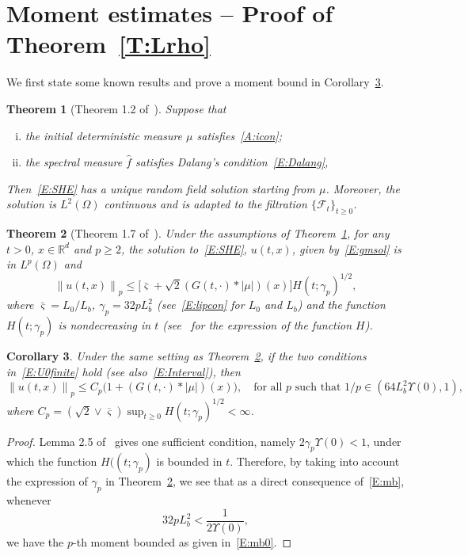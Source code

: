 \documentclass[a4paper,11pt]{article}%
\theoremstyle{plain}
\newtheorem{theorem}{Theorem}[section]
\newtheorem{corollary}[theorem]{Corollary}
\theoremstyle{definition}
\numberwithin{equation}{section}
\newcommand{\R}{\mathbb{R}}
\newcommand{\Norm}[1]{\left\| #1 \right\|}
\begin{document}
\section{Moment estimates -- Proof of Theorem~\ref{T:Lrho}}\label{S:Lrho}
We first state some known results and prove a moment bound in Corollary~\ref{C:Mom}.

\begin{theorem}[Theorem 1.2 of~\cite{chen.huang:19:comparison}]\label{T:Solve}
  Suppose that
  \begin{enumerate}[(i)]
   \item the initial deterministic measure $\mu$ satisfies~\eqref{A:icon};
   \item the spectral measure $\widehat{f}$ satisfies \textit{Dalang's condition}~\eqref{E:Dalang},
  \end{enumerate}
  Then~\eqref{E:SHE} has a unique random field solution starting from $\mu$. Moreover, the solution
  is $L^2 (\Omega)$ continuous and is adapted to the filtration $\{\mathcal{F}_t\}_{t\ge 0}$.
\end{theorem}

\begin{theorem}[Theorem 1.7 of~\cite{chen.huang:19:comparison}]\label{T:ExUn}
  Under the assumptions of Theorem~\ref{T:Solve}, for any $t>0$, $x \in \R^d$ and $p \ge 2$, the
  solution to~\eqref{E:SHE}, $u(t,x)$, given by~\eqref{E:gmsol} is in $L^p (\Omega)$ and
  \begin{equation}\label{E:mb}
    \Norm{u(t,x)}_p \le \big[\bar{\varsigma}+\sqrt{2}(G(t,\cdot) * |\mu|)(x)\big]H(t;\gamma_p)^{1/2},
  \end{equation}
  where $\bar{\varsigma} = L_0/L_b$, $\gamma_p = 32pL_b^2$ (see~\eqref{E:lipcon} for $L_0$ and $L_b$)
  and the function $H(t;\gamma_p)$ is nondecreasing in $t$ (see~\cite{chen.huang:19:comparison} for
  the expression of the function $H$).
\end{theorem}

\begin{corollary}\label{C:Mom}
  Under the same setting as Theorem~\ref{T:ExUn}, if the two conditions in~\eqref{E:U0finite} hold
  (see also~\eqref{E:Interval}), then
  \begin{equation}\label{E:mb0}
    \Norm{u(t,x)}_p \le C_p\bigg(1+ (G(t, \cdot)*|\mu|)(x) \bigg),
    \quad \text{for all $p$ such that } 1/p \in \left(64 L_b^2\Upsilon(0),1\right),
  \end{equation}
  where $C_p = \left(\sqrt{2}\vee \overline{\varsigma}\right)\sup_{t\ge 0}
  H(t;\gamma_p)^{1/2}<\infty$.
\end{corollary}
\begin{proof}
  Lemma 2.5 of~\cite{chen.kim:19:nonlinear} gives one sufficient condition, namely
  $2\gamma_p\Upsilon(0)<1$, under which the function $H((t;\gamma_p)$ is bounded in $t$. Therefore,
  by taking into account the expression of $\gamma_p$ in Theorem~\ref{T:ExUn}, we see that as a
  direct consequence of~\eqref{E:mb}, whenever
  \begin{equation}\label{E:pLip}
     32 p L_b^2 < \frac{1}{2\Upsilon(0)},
  \end{equation}
  we have the $p$-th moment bounded as given in~\eqref{E:mb0}.
\end{proof}
\end{document}
